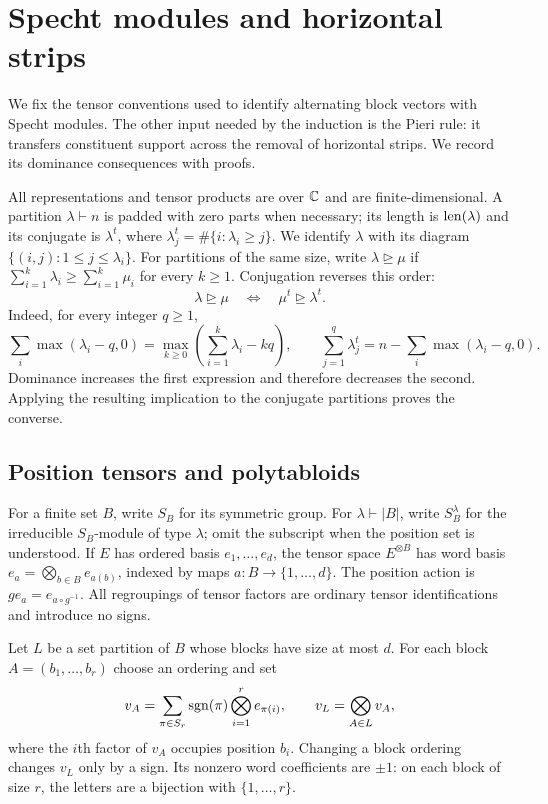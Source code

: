 \section{Specht modules and horizontal strips}
\label{sec:specht-tools}

We fix the tensor conventions used to identify alternating block vectors
with Specht modules. The other input needed by the induction is the
Pieri rule: it transfers constituent support across the removal of
horizontal strips. We record its dominance consequences with proofs.

All representations and tensor products are over $\mathbb C$ and are
finite-dimensional.  A partition $\lambda\vdash n$ is padded with zero
parts when necessary; its length is $\operatorname{len}(\lambda)$ and its conjugate is
$\lambda^t$, where $\lambda^t_j=\#\{i:\lambda_i\ge j\}$.  We identify
$\lambda$ with its diagram $\{(i,j):1\le j\le\lambda_i\}$.
For partitions of the same size, write $\lambda\unrhd\mu$ if
$\sum_{i=1}^k\lambda_i\ge\sum_{i=1}^k\mu_i$ for every $k\ge1$.
Conjugation reverses this order:
\begin{equation}\label{tools:conjugate-dominance}
 \lambda\unrhd\mu\quad\Longleftrightarrow\quad
 \mu^t\unrhd\lambda^t.
\end{equation}
Indeed, for every integer $q\ge1$,
\[
 \sum_i\max(\lambda_i-q,0)
 =\max_{k\ge0}\left(\sum_{i=1}^k\lambda_i-kq\right),
 \qquad
 \sum_{j=1}^q\lambda^t_j
 =n-\sum_i\max(\lambda_i-q,0).
\]
Dominance increases the first expression and therefore decreases the
second.  Applying the resulting implication to the conjugate partitions
proves the converse.

\subsection{Position tensors and polytabloids}

For a finite set $B$, write $S_B$ for its symmetric group. For
$\lambda\vdash |B|$, write $S_B^\lambda$ for the irreducible $S_B$-module
of type $\lambda$; omit the subscript when the position set is understood.
If $E$ has
ordered basis $e_1,\ldots,e_d$, the tensor space $E^{\otimes B}$ has word
basis $e_a=\bigotimes_{b\in B}e_{a(b)}$, indexed by maps
$a:B\to\{1,\ldots,d\}$.  The position action is
$g e_a=e_{a\circ g^{-1}}$.  All regroupings of tensor factors are ordinary
tensor identifications and introduce no signs.

Let $L$ be a set partition of $B$ whose blocks have size at most $d$.
For each block $A=(b_1,\ldots,b_r)$ choose an ordering and set
\begin{equation}\label{tools:block-tensor}
 v_A=\sum_{\pi\in S_r}\operatorname{sgn}(\pi)
       \bigotimes_{i=1}^r e_{\pi(i)},\qquad
 v_L=\bigotimes_{A\in L}v_A,
\end{equation}
where the $i$th factor of $v_A$ occupies position $b_i$.
Changing a block ordering changes $v_L$ only by a sign.  Its nonzero
word coefficients are $\pm1$: on each block of size $r$, the letters are
a bijection with $\{1,\ldots,r\}$.

